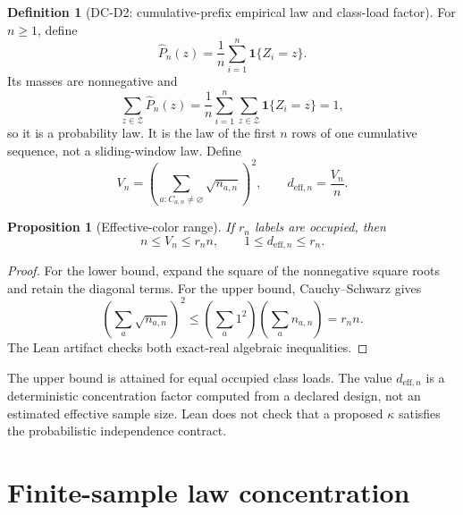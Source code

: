 \documentclass[11pt]{article}
\newtheorem{proposition}[theorem]{Proposition}
\theoremstyle{definition}
\newtheorem{definition}[theorem]{Definition}
\newcommand{\cZ}{\mathcal{Z}}
\newcommand{\Phat}{\widehat{P}}
\newcommand{\Ind}{\mathbf{1}}
\begin{document}
\begin{definition}[DC-D2: cumulative-prefix empirical law and class-load factor]
\label{def:dc-empirical}
For $n\ge1$, define
\begin{equation}
  \Phat_n(z)=\frac1n\sum_{i=1}^{n}\Ind\{Z_i=z\}.
\end{equation}
Its masses are nonnegative and
\begin{equation}
  \sum_{z\in\cZ}\Phat_n(z)
  =\frac1n\sum_{i=1}^n\sum_{z\in\cZ}\Ind\{Z_i=z\}=1,
\end{equation}
so it is a probability law.  It is the law of the first $n$ rows of one cumulative sequence, not a
sliding-window law.  Define
\begin{equation}
  V_n=\left(\sum_{a:C_{a,n}\ne\varnothing}\sqrt{n_{a,n}}\right)^2,
  \qquad
  d_{\mathrm{eff},n}=\frac{V_n}{n}.
\end{equation}
\end{definition}

\begin{proposition}[Effective-color range]\label{prop:effective-range}
If $r_n$ labels are occupied, then
\begin{equation}
  n\le V_n\le r_n n,
  \qquad
  1\le d_{\mathrm{eff},n}\le r_n.
\end{equation}
\end{proposition}

\begin{proof}
For the lower bound, expand the square of the nonnegative square roots and retain the diagonal
terms.  For the upper bound, Cauchy--Schwarz gives
\begin{equation}
  \left(\sum_a\sqrt{n_{a,n}}\right)^2
  \le\left(\sum_a1^2\right)\left(\sum_an_{a,n}\right)=r_n n.
\end{equation}
The Lean artifact checks both exact-real algebraic inequalities.
\end{proof}

The upper bound is attained for equal occupied class loads.  The value
$d_{\mathrm{eff},n}$ is a deterministic concentration factor computed from a declared design, not
an estimated effective sample size.  Lean does not check that a proposed $\kappa$ satisfies the
probabilistic independence contract.

\section{Finite-sample law concentration}
\end{document}
